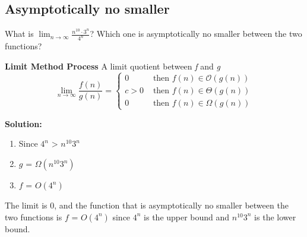 \documentclass[11pt,fleqn]{book}
\begin{document}
\subsection{Asymptotically no smaller}
\begin{example}
 What is $\lim_{n \to \infty} \frac{n^{10}\cdot 3^n}{4^n}$?  Which one is asymptotically no smaller between the two functions?
\end{example}
\begin{definition}\textbf{Limit Method Process} A limit quotient between \textit{f} and \textit{g}
\[
\lim_{n \to \infty} \frac{f(n)}{g(n)} =
\begin{cases} 
      0 & \text{ then } f(n) \in \mathcal{O}(g(n)) \\
      c > 0 & \text{ then } f(n) \in \Theta(g(n))\\
      0 & \text{ then } f(n) \in \Omega(g(n)) 
 \end{cases}
 \]
\end{definition}
\textbf{Solution:}
\begin{enumerate}
    \item Since $4^n\text{ > } n^{10}3^n$
    \item $g \text{ = } \Omega(n^{10}3^n)$
    \item $f \text{ = } O(4^n)$
\end{enumerate}
The limit is $0$, and the function that is asymptotically no smaller between the two functions is $f \text{ = } O(4^n)$ since $4^n$ is the upper bound and $n^{10}3^n$ is the lower bound. 
\end{document}
